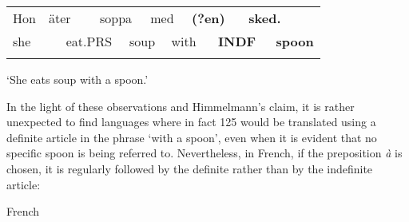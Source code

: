 \begin{tabular}{llllllllllll}
\lsptoprule
Hon & \multicolumn{2}{l}{äter

} & \multicolumn{2}{l}{soppa

} & \multicolumn{2}{l}{med

} & \multicolumn{2}{l}{{\bfseries (?en)}

} & \multicolumn{2}{l}{{\bfseries sked.}

} & \\
\multicolumn{2}{l}{she

} & \multicolumn{2}{l}{eat.PRS

} & \multicolumn{2}{l}{soup

} & \multicolumn{2}{l}{with

} & \multicolumn{2}{l}{{\bfseries INDF}

} & \multicolumn{2}{l}{{\bfseries spoon}

}\\
\lspbottomrule
\end{tabular}

\begin{styleTranslation}
‘She eats soup with a spoon.’

\end{styleTranslation}

\begin{styleBodyTextFirst}
In the light of these observations and Himmelmann’s claim, it is rather unexpected to find languages where in fact 125 would be translated using a definite article in the phrase ‘with a spoon’, even when it is evident that no specific spoon is being referred to. Nevertheless, in French, if the preposition \textit{à} is chosen, it is regularly followed by the definite rather than by the indefinite article:

\end{styleBodyTextFirst}

\begin{listWWNumileveli}
\item {}

\begin{styleExample}
French

\end{styleExample}

\end{listWWNumileveli}

